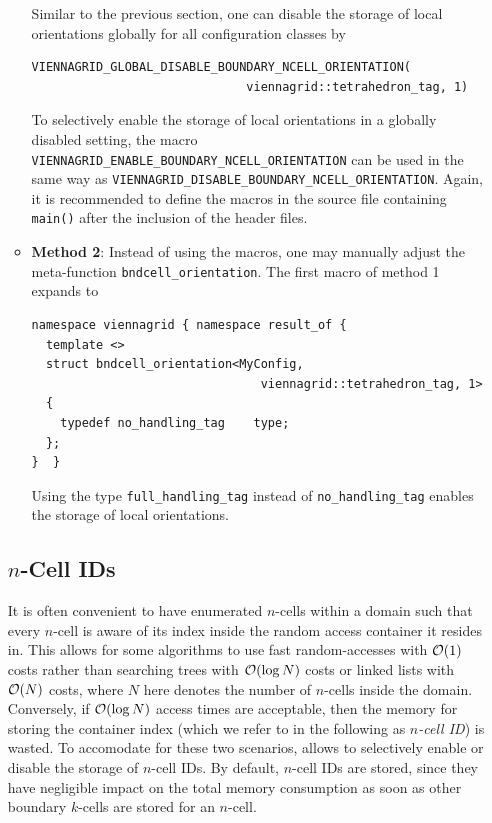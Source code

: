 \begin{itemize}
\begin{itemize}
Similar to the previous section, one can disable the storage of local orientations globally for all configuration classes by
\begin{lstlisting}
VIENNAGRID_GLOBAL_DISABLE_BOUNDARY_NCELL_ORIENTATION(
                              viennagrid::tetrahedron_tag, 1) 
\end{lstlisting}
To selectively enable the storage of local orientations in a globally disabled setting, the macro \lstinline|VIENNAGRID_ENABLE_BOUNDARY_NCELL_ORIENTATION| can be used in the same way as \lstinline|VIENNAGRID_DISABLE_BOUNDARY_NCELL_ORIENTATION|.
Again, it is recommended to define the macros in the source file containing \lstinline|main()| after the inclusion of the {\ViennaGrid} header files.

 \item \textbf{Method 2}: Instead of using the macros, one may manually adjust the meta-function \lstinline|bndcell_orientation|. The first macro of method 1 expands to
 \begin{lstlisting}
namespace viennagrid { namespace result_of {
  template <>
  struct bndcell_orientation<MyConfig,
                                viennagrid::tetrahedron_tag, 1>
  {
    typedef no_handling_tag    type;
  };
}  }
 \end{lstlisting}
Using the type \lstinline|full_handling_tag| instead of \lstinline|no_handling_tag| enables the storage of local orientations.
\end{itemize}


\subsection{$n$-Cell IDs} \label{subsec:ncell-ids}
It is often convenient to have enumerated $n$-cells within a domain such that every $n$-cell is aware of its index inside the random access container it resides in. This allows for some algorithms to use fast random-accesses with $\mathcal{O}(1)$ costs rather than searching trees with $\mathcal{O}(\log N)$ costs or linked lists with $\mathcal{O}(N)$ costs, where $N$ here denotes the number of $n$-cells inside the domain. Conversely, if $\mathcal{O}(\log N)$ access times are acceptable, then the memory for storing the container index (which we refer to in the following as \emph{$n$-cell ID}) is wasted. To accomodate for these two scenarios, {\ViennaGrid} allows to selectively enable or disable the storage of $n$-cell IDs. By default, $n$-cell IDs are stored, since they have negligible impact on the total memory consumption as soon as other boundary $k$-cells are stored for an $n$-cell.


\end{itemize}
